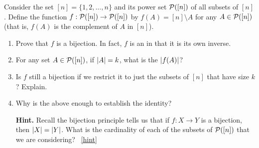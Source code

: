 \documentclass{book}
\begin{document}
\setcounter{project}{75}
\addtocounter{project}{-1}
\begin{activity}[]\label{act-pascalsym-bij}
\hypertarget{p-580}{}%
Consider the set \([n] = \{1,2,\ldots,n\}\) and its power set \(\mathcal P([n])\) of all subsets of \([n]\).  Define the function \(f:\mathcal P([n]) \to \mathcal P([n])\) by \(f(A) = [n]\setminus A\) for any \(A \in \mathcal P([n])\) (that is, \(f(A)\) is the complement of \(A\) in \([n]\)).%
\begin{enumerate}[font=\bfseries,label=(\alph*),ref=\alph*]
\item\label{task-107} \hypertarget{p-581}{}%
Prove that \(f\) is a bijection.  In fact, \(f\) is an  in that it is its own inverse.%
\item\label{task-108} \hypertarget{p-582}{}%
For any set \(A \in \mathcal P([n])\), if \(\left| A \right| = k\), what is the \(\left| f(A) \right|\)?%
\item\label{task-109} \hypertarget{p-583}{}%
Is \(f\) still a bijection if we restrict it to just the subsets of \([n]\) that have size \(k\)?  Explain.%
\item\label{task-110} \hypertarget{p-584}{}%
Why is the above enough to establish the identity?%
\par\smallskip%
\noindent\textbf{Hint.}\hypertarget{hint-31}{}\quad%
\hypertarget{p-585}{}%
Recall the bijection principle tells us that if \(f:X \to Y\) is a bijection, then \(\left| X \right| = \left| Y \right|\).  What is the cardinality of each of the subsets of \(\mathcal P([n])\) that we are considering?%
~\hfill{\tiny\hyperlink{a-75.d}{[hint]}\hypertarget{q-75.d}{}}\end{enumerate}
\end{activity}

\clearpage
\end{document}
